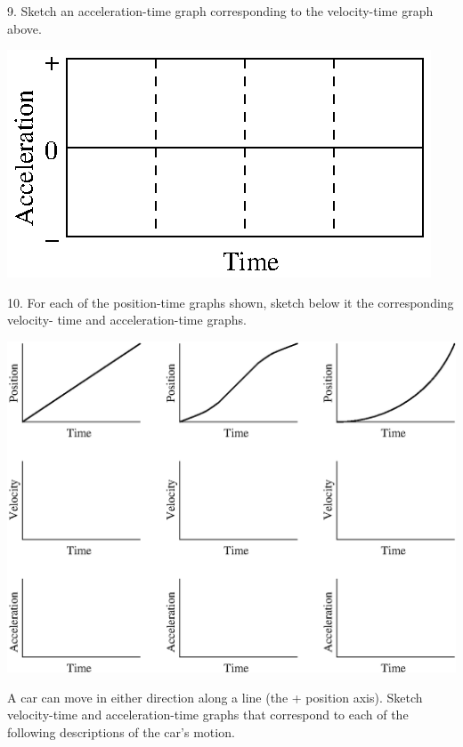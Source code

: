 9. Sketch an acceleration-time graph corresponding to the velocity-time graph
above.

\vspace{0.3cm}
{\par\centering \includegraphics{slowing/slowing_fig14.eps} \par}
\vspace{0.3cm}

\newpage

10. For each of the position-time graphs shown, sketch below it the corresponding
velocity- time and acceleration-time graphs.

\vspace{0.3cm}
{\par\centering \includegraphics{slowing/slowing_fig11.eps} \par}
\vspace{0.3cm}

A car can move in either direction along a line (the + position axis). Sketch
velocity-time and acceleration-time graphs that correspond to each of the following
descriptions of the car's motion.

